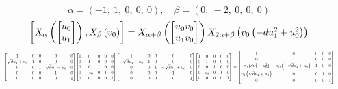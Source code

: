 \documentclass[11pt]{article}
\theoremstyle{definition}
\begin{document}
\[
\alpha = \left( -1, \  1, \  0, \  0, \  0\right), \quad \beta = \left( 0, \  -2, \  0, \  0, \  0\right)
\]
\[
\scaletoalign{\textwidth}{\left[ X_{\alpha}\left(\left[\begin{matrix}u_{0}\\u_{1}\end{matrix}\right]\right), X_{\beta}\left(v_{0}\right) \right] = X_{\alpha + \beta}\left(\left[\begin{matrix}u_{0} v_{0}\\u_{1} v_{0}\end{matrix}\right]\right) X_{2\alpha + \beta}\left(v_{0} \left(- d u_{1}^{2} + u_{0}^{2}\right)\right)}
\]
\[
\scaletoalign{\textwidth}{{\left[\begin{matrix}1 & 0 & 0 & 0 & 0\\\sqrt{d} u_{1} + u_{0} & 1 & 0 & 0 & 0\\0 & 0 & 1 & \sqrt{d} u_{1} - u_{0} & 0\\0 & 0 & 0 & 1 & 0\\0 & 0 & 0 & 0 & 1\end{matrix}\right]} {\left[\begin{matrix}1 & 0 & 0 & 0 & 0\\0 & 1 & 0 & 0 & 0\\0 & 0 & 1 & 0 & 0\\0 & - v_{0} & 0 & 1 & 0\\0 & 0 & 0 & 0 & 1\end{matrix}\right]} {\left[\begin{matrix}1 & 0 & 0 & 0 & 0\\- \sqrt{d} u_{1} - u_{0} & 1 & 0 & 0 & 0\\0 & 0 & 1 & - \sqrt{d} u_{1} + u_{0} & 0\\0 & 0 & 0 & 1 & 0\\0 & 0 & 0 & 0 & 1\end{matrix}\right]} {\left[\begin{matrix}1 & 0 & 0 & 0 & 0\\0 & 1 & 0 & 0 & 0\\0 & 0 & 1 & 0 & 0\\0 & v_{0} & 0 & 1 & 0\\0 & 0 & 0 & 0 & 1\end{matrix}\right]} = {\left[\begin{matrix}1 & 0 & 0 & 0 & 0\\0 & 1 & 0 & 0 & 0\\v_{0} \left(d u_{1}^{2} - u_{0}^{2}\right) & v_{0} \left(- \sqrt{d} u_{1} + u_{0}\right) & 1 & 0 & 0\\v_{0} \left(\sqrt{d} u_{1} + u_{0}\right) & 0 & 0 & 1 & 0\\0 & 0 & 0 & 0 & 1\end{matrix}\right]}}
\]
\end{document}
